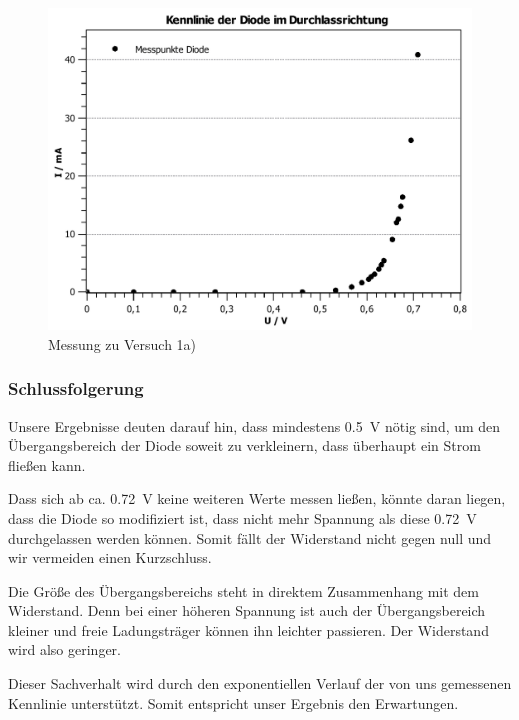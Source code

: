 \documentclass[11pt,a4paper,titlepage, ngerman]{article}
\begin{document}
				\begin{figure}
					\centering
					\includegraphics[width=\textwidth]{KennlinieDiode.pdf}
					\caption{Messung zu Versuch 1a)}
					\label{KL a}
				\end{figure}
			
			\subsubsection*{Schlussfolgerung}
			
				Unsere Ergebnisse deuten darauf hin, dass mindestens \SI{0.5}{\V} nötig sind, um den Übergangsbereich der Diode soweit zu verkleinern, dass überhaupt ein Strom fließen kann. 
				
				Dass sich ab ca. \SI{0.72}{\V} keine weiteren Werte messen ließen, könnte daran liegen, dass die Diode so modifiziert ist, dass nicht mehr Spannung als diese \SI{0.72}{\V} durchgelassen werden können.
				Somit fällt der Widerstand nicht gegen null und wir vermeiden einen Kurzschluss.
				
				Die Größe des Übergangsbereichs steht in direktem Zusammenhang mit dem Widerstand.
				Denn bei einer höheren Spannung ist auch der Übergangsbereich kleiner und freie Ladungsträger können ihn leichter passieren.
				Der Widerstand wird also geringer.
				
				Dieser Sachverhalt wird durch den exponentiellen Verlauf der von uns gemessenen Kennlinie unterstützt.
				Somit entspricht unser Ergebnis den Erwartungen.
				
\end{document}
